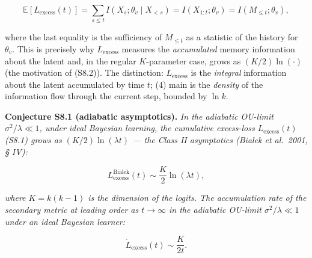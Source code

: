 \documentclass[pdflatex,sn-mathphys-ay]{sn-jnl}
\providecommand{\lt}{<}\providecommand{\gt}{>}
\begin{document}
\[\mathbb{E}[L_{\text{excess}}(t)] = \sum_{s\le t} I(X_s;\theta_v\mid X_{\lt s}) = I(X_{1:t};\theta_v) = I(M_{\le t};\theta_v),\]



where the last equality is the sufficiency of \(M_{\le t}\) as a statistic of the history for \(\theta_v\). This is precisely why \(L_{\text{excess}}\) measures the \emph{accumulated} memory information about the latent and, in the regular \(K\)-parameter case, grows as \((K/2)\ln(\cdot)\) (the motivation of (S8.2)). The distinction: \(L_{\text{excess}}\) is the \emph{integral} information about the latent accumulated by time \(t\); (4) main is the \emph{density} of the information flow through the current step, bounded by \(\ln k\).



\textbf{Conjecture S8.1 (adiabatic asymptotics).} \emph{In the adiabatic OU-limit \(\sigma^2/\lambda \ll 1\), under ideal Bayesian learning, the cumulative excess-loss \(L_{\text{excess}}(t)\) (S8.1) grows as \((K/2)\ln(\lambda t)\) --- the Class II asymptotics (Bialek et al.~2001, § IV):}



\begin{equation}L_{\text{excess}}^{\text{Bialek}}(t) \sim \frac{K}{2} \ln(\lambda t), \tag{S8.2}\end{equation}



\emph{where \(K = k(k-1)\) is the dimension of the logits. The accumulation rate of the secondary metric at leading order as \(t \to \infty\) in the adiabatic OU-limit \(\sigma^2/\lambda \ll 1\) under an ideal Bayesian learner:}



\begin{equation}\dot{L}_{\text{excess}}(t) \sim \frac{K}{2 t}. \tag{S8.3}\end{equation}
\end{document}
